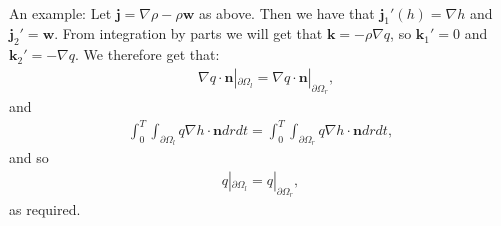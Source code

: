 \documentclass[11pt, a4paper]{article}
\theoremstyle{definition}
\newcommand{\w}{\mathbf{w}}
\newcommand{\n}{\mathbf{n}}
\newcommand{\jf}{\mathbf j}
\begin{document}
	\\
	An example: Let $\jf = \nabla \rho - \rho \w$ as above. Then we have that $\jf_1'(h) = \nabla h$ and $\jf_2' = \w $. From integration by parts we will get that $\mathbf k = - \rho \nabla q$, so $\mathbf k_1' = 0$ and $\mathbf k_2' = -  \nabla q$.
	We therefore get that:
	\begin{align*}
		& \nabla q \cdot \n |_{\partial \Omega_l} = \nabla q \cdot \n |_{\partial \Omega_r},
	\end{align*}
	and
	\begin{align*}
		\int_0^T \int_{\partial \Omega_l}  q \nabla h   \cdot \n    dr dt = \int_0^T \int_{\partial \Omega_r} q \nabla h  \cdot \n    dr dt,
	\end{align*}
	and so 
	\begin{align*}
		q |_{\partial \Omega_l} = q|_{\partial \Omega_r},
	\end{align*}
	as required.
\end{document}
